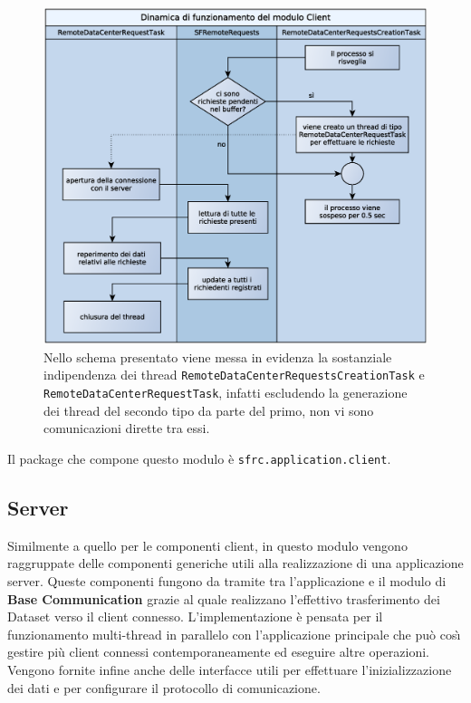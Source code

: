 \begin{figure}
\begin{center}
\includegraphics[width=\textwidth]{Immagini/DinamicaClient}
\caption[Dinamica del modulo client.]{Nello schema presentato viene messa in evidenza la sostanziale indipendenza dei thread \texttt{RemoteDataCenterRequestsCreationTask} e \texttt{RemoteDataCenterRequestTask}, infatti escludendo la generazione dei thread del secondo tipo da parte del primo, non vi sono comunicazioni dirette tra essi.\label{f:dinamicaclient}} 
\end{center} 
\end{figure}


Il package che compone questo modulo \`e \texttt{sfrc.application.client}.

\subsection{Server}
\label{sub:servermodule}
Similmente a quello per le componenti client, in questo modulo vengono raggruppate delle componenti generiche utili alla realizzazione di una applicazione server. Queste componenti fungono da tramite tra l'applicazione e il modulo di \textbf{Base Communication} grazie al quale realizzano l'effettivo trasferimento dei Dataset verso il client connesso.
L'implementazione \`e pensata per il funzionamento multi-thread in parallelo con l'applicazione principale che pu\`o cos{\`\i} gestire pi\`u client connessi contemporaneamente ed eseguire altre operazioni.
Vengono fornite infine anche delle interfacce utili per effettuare l'inizializzazione dei dati e per configurare il protocollo di comunicazione.

